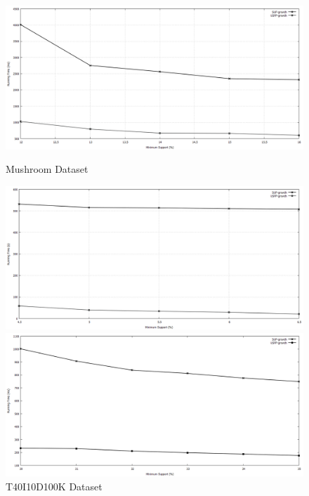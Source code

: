\documentclass[conference]{IEEEtran}
\begin{document}
%    
\begin{figure}[t]
	\begin{minipage}{0.32\linewidth}
		\centering
		\includegraphics[width=\textwidth]{images/result/g_m_total}
		\caption{ Mushroom Dataset }
		\label{result:g_m_total}
	\end{minipage}%
    \begin{minipage}{0.32\linewidth}
		\centering
		\includegraphics[width=\textwidth]{images/result/g_t10_total}
		\caption{ T40I10D100K Dataset }
		\label{result:g_t10_total}
    \end{minipage}
	\begin{minipage}{0.32\linewidth}
		\centering
		\includegraphics[width=\textwidth]{images/result/g_chess_total}

\end{minipage}
\end{figure}
\end{document}
